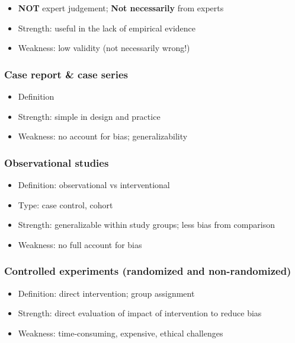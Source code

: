 \documentclass[
  letterpaper,
  DIV=11,
  numbers=noendperiod]{scrartcl}
\begin{document}
\begin{itemize}
\item
  \textbf{NOT} expert judgement; \textbf{Not necessarily} from experts
\item
  Strength: useful in the lack of empirical evidence
\item
  Weakness: low validity (not necessarily wrong!)
\end{itemize}

\subsubsection{Case report \& case
series}\label{case-report-case-series}

\begin{itemize}
\item
  Definition
\item
  Strength: simple in design and practice
\item
  Weakness: no account for bias; generalizability
\end{itemize}

\subsubsection{Observational studies}\label{observational-studies}

\begin{itemize}
\item
  Definition: observational vs interventional
\item
  Type: case control, cohort
\item
  Strength: generalizable within study groups; less bias from comparison
\item
  Weakness: no full account for bias
\end{itemize}

\subsubsection{Controlled experiments (randomized and
non-randomized)}\label{controlled-experiments-randomized-and-non-randomized}

\begin{itemize}
\item
  Definition: direct intervention; group assignment
\item
  Strength: direct evaluation of impact of intervention to reduce bias
\item
  Weakness: time-consuming, expensive, ethical challenges
\end{itemize}
\end{document}
